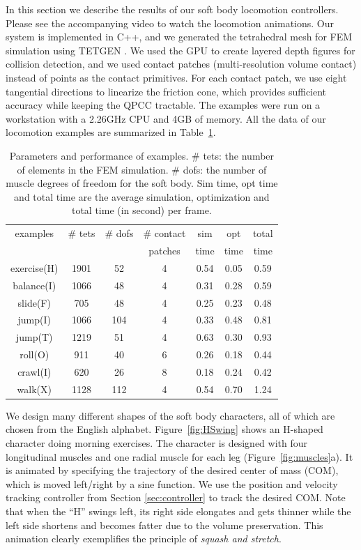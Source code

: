 In this section we describe the results of our soft body locomotion
controllers. Please see the accompanying video to watch the locomotion
animations. Our system is implemented in C++, and we generated the
tetrahedral mesh for FEM simulation using TETGEN \cite{Si:2006}. We
used the GPU to create layered depth figures for collision detection,
and we used contact patches (multi-resolution volume contact)
\cite{Allard:2010} instead of points as the contact primitives. For
each contact patch, we use eight tangential directions to linearize
the friction cone, which provides sufficient accuracy while keeping the QPCC tractable. The examples were run on a workstation with a
2.26GHz CPU and 4GB of memory. All the data of our locomotion
examples are summarized in Table~\ref{table:data}.

\begin{table}[!b]
\centering
\begin{tabular}{|c|c|c|c|c|c|c|}
\hline
examples & \# tets & \# dofs  & \# contact     & sim  & opt & total\\
         & & & patches & time & time & time\\
 \hline
exercise(H) & 1901 & 52  & 4 & 0.54 & 0.05 & 0.59\\
balance(I)  & 1066 & 48  & 4 & 0.31 & 0.28 & 0.59\\
slide(F)    & 705  & 48  & 4 & 0.25 & 0.23 & 0.48 \\
jump(I)     & 1066 & 104 & 4 & 0.33 & 0.48 & 0.81 \\
jump(T)     & 1219 & 51  & 4 & 0.63 & 0.30 & 0.93 \\
roll(O)     & 911  & 40  & 6 & 0.26 & 0.18 & 0.44\\
crawl(I)    & 620  & 26  & 8 & 0.18 & 0.24 & 0.42\\
walk(X)     & 1128 & 112 & 4 & 0.54 & 0.70 & 1.24\\

\hline
 \end{tabular}
 \caption{Parameters and performance of examples. \# tets: the number of
  elements in the FEM simulation. \# dofs: the number of muscle degrees of
  freedom for the soft body. Sim time, opt time and total time are the average simulation,
  optimization and total time (in second) per frame.}
 \label{table:data}
 \end{table}

We design many different shapes of the soft body characters, all of
which are chosen from the English alphabet. Figure~\ref{fig:HSwing} shows
an H-shaped character doing morning exercises. The character is designed
with four longitudinal muscles and one radial muscle for each
leg (Figure~\ref{fig:muscles}a). It is animated by specifying the
trajectory of the desired center of mass (COM), which is moved left/right
by a sine function. We use the position and velocity tracking controller
from Section \ref{sec:controller} to track the desired COM. Note that when
the ``H'' swings left, its right side elongates and gets thinner while the
left side shortens and becomes fatter due to the volume preservation. This
animation clearly exemplifies the principle of \emph{squash and stretch}.

